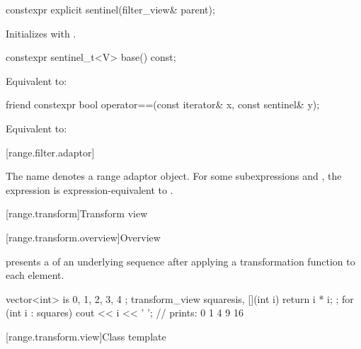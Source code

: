 %
\begin{itemdecl}
constexpr explicit sentinel(filter_view& parent);
\end{itemdecl}

\begin{itemdescr}
\pnum
\effects
Initializes  with .
\end{itemdescr}

%
\begin{itemdecl}
constexpr sentinel_t<V> base() const;
\end{itemdecl}

\begin{itemdescr}
\pnum
\effects
Equivalent to: 
\end{itemdescr}

%
\begin{itemdecl}
friend constexpr bool operator==(const iterator& x, const sentinel& y);
\end{itemdecl}

\begin{itemdescr}
\pnum
\effects
Equivalent to: 
\end{itemdescr}

[range.filter.adaptor]{}

\pnum
The name  denotes a
range adaptor object.
For some subexpressions  and ,
the expression  is expression-equivalent to
.


[range.transform]{Transform view}

[range.transform.overview]{Overview}

\pnum
{} presents
a  of an underlying sequence after
applying a transformation function to each element.

\pnum
\begin{example}
\begin{codeblock}
vector<int> is{ 0, 1, 2, 3, 4 };
transform_view squares{is, [](int i) { return i * i; }};
for (int i : squares)
  cout << i << ' '; // prints: 0 1 4 9 16
\end{codeblock}
\end{example}

[range.transform.view]{Class template }

